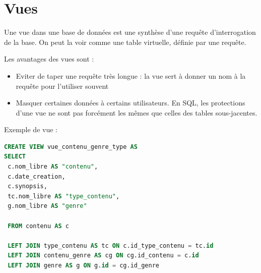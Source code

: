 \section{Vues}
Une vue dans une base de données est une synthèse d'une requête d'interrogation de la base. On peut la voir comme une table virtuelle, définie par une requête.

Les avantages des vues sont :

\begin{itemize}
    \item Eviter de taper une requête très longue : la vue sert à donner un nom à la requête pour l'utiliser souvent
    \item Masquer certaines données à certains utilisateurs. En SQL, les protections d'une vue ne sont pas forcément les mêmes que celles des tables sous-jacentes.
\end{itemize}

Exemple de vue :
\begin{lstlisting}[language=SQL]
CREATE VIEW vue_contenu_genre_type AS
SELECT
 c.nom_libre AS "contenu",
 c.date_creation,
 c.synopsis,
 tc.nom_libre AS "type_contenu",
 g.nom_libre AS "genre"
 
 FROM contenu AS c
 
 LEFT JOIN type_contenu AS tc ON c.id_type_contenu = tc.id
 LEFT JOIN contenu_genre AS cg ON cg.id_contenu = c.id
 LEFT JOIN genre AS g ON g.id = cg.id_genre
\end{lstlisting}